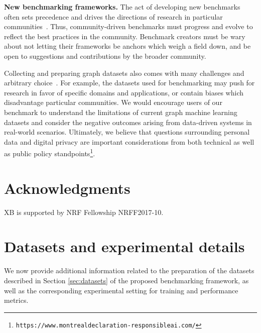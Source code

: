 \documentclass{article}
\begin{document}
\textbf{New benchmarking frameworks. }
The act of developing new benchmarks often sets precedence and drives the directions of research in particular communities~\cite{russakovsky2015imagenet,wang2019superglue,barbu2019objectnet}.
Thus, community-driven benchmarks must progress and evolve to reflect the best practices in the community.
Benchmark creators must be wary about not letting their frameworks be anchors which weigh a field down, and be open to suggestions and contributions by the broader community.

Collecting and preparing graph datasets also comes with many challenges and arbitrary choice~\cite{hu2020ogb}.
For example, the datasets used for benchmarking may push for research in favor of specific domains and applications, or contain biases which disadvantage particular communities.
We would encourage users of our benchmark to understand the limitations of current graph machine learning datasets and consider the negative outcomes arising from data-driven systems in real-world scenarios.
Ultimately, we believe that questions surrounding personal data and digital privacy are important considerations from both technical as well as public policy standpoints\footnote{\small \texttt{https://www.montrealdeclaration-responsibleai.com/}}.




















 

\section*{Acknowledgments}
XB is supported by NRF Fellowship NRFF2017-10.





\newpage
\appendix

\section{Datasets and experimental details}
We now provide additional information related to the preparation of the datasets described in Section \ref{sec:datasets} of the proposed benchmarking framework, as well as the corresponding experimental setting for training and performance metrics.
\end{document}

